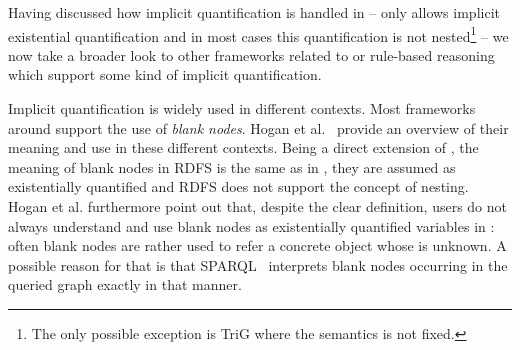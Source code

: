 \label{iq}
Having discussed how implicit quantification is handled in \rdf{} -- \rdf only allows implicit existential quantification and 
in most cases this quantification is not nested\footnote{The only possible exception is TriG where the semantics is not fixed.} -- we now take a broader look 
to other frameworks related to \rdf or rule-based reasoning which support some kind of implicit quantification.

Implicit quantification is widely used in different contexts. Most frameworks around \rdf support the use of \emph{blank nodes}. 
Hogan et al.~\cite{blanks} provide an overview of their meaning and use in these different contexts. 
Being a direct extension of \rdf, the meaning of blank nodes in RDFS is the same as in \rdf, they are assumed as existentially quantified and RDFS does not support the concept of nesting.
Hogan et al.{} furthermore point out that, despite the clear definition, users do not always understand and use blank nodes as existentially quantified variables in \rdf: 
often blank nodes are rather used to refer a concrete object whose \iri is unknown. %
A possible reason 
for that is that SPARQL~\cite{sparql} interprets blank nodes occurring in the queried \rdf graph exactly in that manner. 


